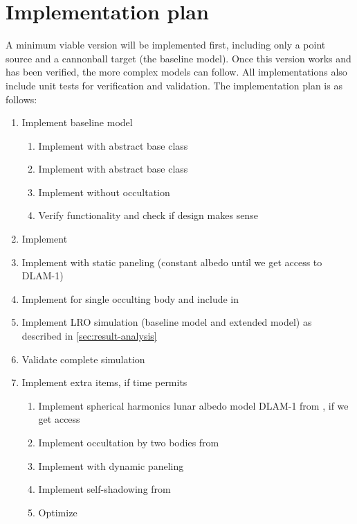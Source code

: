 \documentclass[parskip=full,DIV=15]{scrartcl}
\begin{document}
\section{Implementation plan}
A minimum viable version will be implemented first, including only a point source and a cannonball target (the baseline model). Once this version works and has been verified, the more complex models can follow. All implementations also include unit tests for verification and validation. The implementation plan is as follows:
\begin{enumerate}
   \item Implement baseline model
   \begin{enumerate}
      \item Implement  with abstract base class
      \item Implement  with abstract base class
      \item Implement  without occultation
      \item Verify functionality and check if design makes sense
   \end{enumerate}
   \item Implement  
   \item Implement  with static paneling (constant albedo until we get access to DLAM-1)
   \item Implement  for single occulting body and include in \\ 
   \item Implement LRO simulation (baseline model and extended model) as described in \cref{sec:result-analysis}
   \item Validate complete simulation
   \item Implement extra items, if time permits
   \begin{enumerate}
      \item Implement spherical harmonics lunar albedo model DLAM-1 from \textcite{Floberghagen1999}, if we get access
      \item Implement occultation by two bodies from \textcite{Zhang2019}
      \item Implement  with dynamic paneling
      \item Implement self-shadowing from \textcite{Mazarico2009}
      \item Optimize
   \end{enumerate}
\end{enumerate}



\printbibliography
\end{document}
